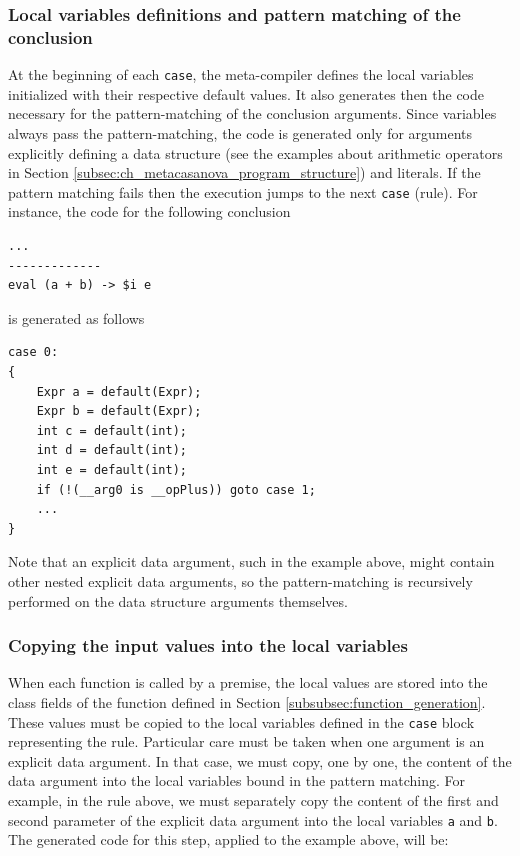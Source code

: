 \subsubsection{Local variables definitions and pattern matching of the conclusion}

At the beginning of each \texttt{case}, the meta-compiler defines the local variables initialized with their respective default values. It also generates then the code necessary for the pattern-matching of the conclusion arguments. Since variables always pass the pattern-matching, the code is generated only for arguments explicitly defining a data structure (see the examples about arithmetic operators in Section \ref{subsec:ch_metacasanova_program_structure}) and literals. If the pattern matching fails then the execution jumps to the next \texttt{case} (rule). For instance, the code for the following conclusion

\begin{lstlisting}
...
-------------
eval (a + b) -> $i e
\end{lstlisting}

\noindent
is generated as follows

\begin{lstlisting}
case 0:
{
	Expr a = default(Expr);
	Expr b = default(Expr);
	int c = default(int);
	int d = default(int);
	int e = default(int);
	if (!(__arg0 is __opPlus)) goto case 1;
	...
}
\end{lstlisting}

\noindent
Note that an explicit data argument, such in the example above, might contain other nested explicit data arguments, so the pattern-matching is recursively performed on the data structure arguments themselves.

\subsubsection{Copying the input values into the local variables}
When each function is called by a premise, the local values are stored into the class fields of the function defined in Section \ref{subsubsec:function_generation}. These values must be copied to the local variables defined in the \texttt{case} block representing the rule. Particular care must be taken when one argument is an explicit data argument. In that case, we must copy, one by one, the content of the data argument into the local variables bound in the pattern matching. For example, in the rule above, we must separately copy the content of the first and second parameter of the explicit data argument into the local variables \texttt{a} and \texttt{b}. The generated code for this step, applied to the example above, will be:

